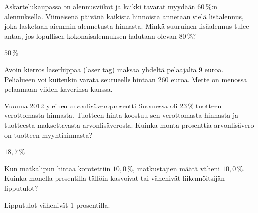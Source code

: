 \begin{tehtavasivu}
\begin{tehtava}
    Askartelukaupassa on alennusviikot ja kaikki tavarat myydään $60\,\%$:n alennuksella. Viimeisenä päivänä kaikista hinnoista annetaan vielä lisäalennus, joka lasketaan aiemmin alennetusta hinnasta. Minkä suuruinen lisäalennus tulee antaa, jos lopullisen kokonaisalennuksen halutaan olevan $80\,\%$?
    \begin{vastaus}
        $50\,\%$
    \end{vastaus}
\end{tehtava}

\begin{tehtava}
	Avoin kierros laserhippaa (laser tag) maksaa yhdeltä pelaajalta $9$ euroa. Pelialueen voi kuitenkin varata seurueelle hintaan $260$ euroa. Mette on menossa pelaamaan viiden kaverinsa kanssa. 
	\begin{vastaus}
	\end{vastaus}
\end{tehtava}

\begin{tehtava}
    Vuonna 2012 yleinen arvonlisäveroprosentti Suomessa oli $23\,\%$ tuotteen verottomasta hinnasta. Tuotteen hinta koostuu sen verottomasta hinnasta ja tuotteesta maksettavasta arvonlisäverosta. Kuinka monta prosenttia arvonlisävero on tuotteen myyntihinnasta?
    \begin{vastaus}
        $18,7\,\%$
    \end{vastaus}
\end{tehtava}

\begin{tehtava}
    Kun matkalipun hintaa korotettiin $10,0\,\%$, matkustajien määrä väheni $10,0\,\%$. Kuinka monella prosentilla tällöin kasvoivat tai vähenivät liikennöitsijän lipputulot?
    \begin{vastaus}
        Lipputulot vähenivät $1$ prosentilla.
    \end{vastaus}
\end{tehtava}


\end{tehtavasivu}
